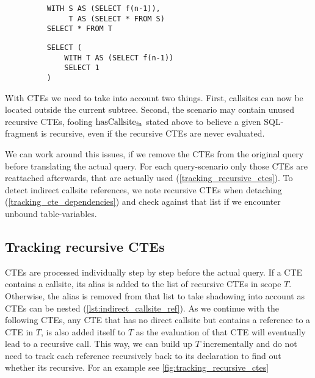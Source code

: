 \begin{wrapfigure}{r}{.5\textwidth}\vspace{-5mm} 
    \begin{minipage}{\linewidth}
    \label{fig:simple_indiref}\par\vfill
    \begin{verbatim}
    WITH S AS (SELECT f(n-1)),
         T AS (SELECT * FROM S)
    SELECT * FROM T
    \end{verbatim}
    \label{fib_nonrec_scenarios}\par\vfill
    \begin{verbatim}
    SELECT (
        WITH T AS (SELECT f(n-1))
        SELECT 1
    )
    \end{verbatim}
    \label{fig:trimmed_ref}
\end{minipage}
\caption{}
\label{lst:indirect_callsite_ref}\vspace{-5mm} 
\end{wrapfigure}

With CTEs we need to take into account two things. First, callsites can now be located outside the current subtree. Second, the scenario may contain unused recursive CTEs, fooling $\operatorname{\text{hasCallsite}_{fn}}$ stated above to believe a given SQL-fragment is recursive, even if the recursive CTEs are never evaluated.

We can work around this issues, if we remove the CTEs from the original query before translating the actual query. For each query-scenario only those CTEs are reattached afterwards, that are actually used (\autoref{tracking_recursive_ctes}). To detect indirect callsite references, we note recursive CTEs when detaching (\autoref{tracking_cte_dependencies}) and check against that list if we encounter unbound table-variables.

\subsection{Tracking recursive CTEs}\label{tracking_recursive_ctes}

CTEs are processed individually step by step before the actual query. If a CTE contains a callsite, its alias is added to the list of recursive CTEs in scope $T$. Otherwise, the alias is removed from that list to take shadowing into account as CTEs can be nested (\autoref{lst:indirect_callsite_ref}). As we continue with the following CTEs, any CTE that has no direct callsite but contains a reference to a CTE in $T$, is also added itself to $T$ as the evaluation of that CTE will eventually lead to a recursive call. This way, we can build up $T$ incrementally and do not need to track each reference recursively back to its declaration to find out whether its recursive. For an example see \autoref{fig:tracking_recursive_ctes}

